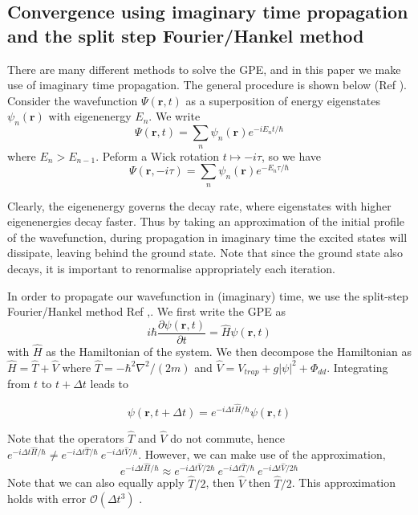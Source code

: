 \documentclass[10pt]{article}
\numberwithin{equation}{section}
\begin{document}
\begin{multicols}{2}
\section{Convergence using imaginary time propagation and the split step Fourier/Hankel method}
There are many different methods to solve the GPE, and in this paper we make use of imaginary time propagation. The general procedure is shown below (Ref \cite{PhysRevE.62.7438}).
Consider the wavefunction $\Psi(\textbf{r},t)$ as a superposition of energy eigenstates $\psi_{n}(\textbf{r})$ with eigenenergy $E_n$. We write
\begin{equation}
\Psi(\textbf{r},t) = \sum_n \psi_{n}(\textbf{r}) e^{-i E_n t /\hbar}
\end{equation}
where $E_n > E_{n-1}$. Peform a Wick rotation $t \mapsto -i \tau$, so we have
\begin{equation}
\Psi(\textbf{r},-i\tau) = \sum_n \psi_{n}(\textbf{r}) e^{-E_n \tau /\hbar}
\end{equation}

Clearly, the eigenenergy governs the decay rate, where eigenstates with higher eigenenergies decay faster. Thus by taking an approximation of the initial profile of the wavefunction, during propagation in imaginary time the excited states will dissipate, leaving behind the ground state. Note that since the ground state also decays, it is important to renormalise appropriately each iteration.

In order to propagate our wavefunction in (imaginary) time, we use the split-step Fourier/Hankel method Ref \cite{4451240},\cite{TAHA1984231}. We first write the GPE as
\begin{equation}
i\hbar \frac{\partial \psi(\textbf{r},t)}{\partial t}=\hat{H} \psi(\textbf{r},t)
\end{equation}
with $\hat{H}$ as the Hamiltonian of the system. We then decompose the Hamiltonian as $\hat{H} = \hat{T} + \hat{V}$ where $\hat{T} = -\hbar^2 \nabla^2 /(2m)$ and $\hat{V} = V_{trap} + g|\psi|^2 + \Phi_{dd}$. Integrating from $t$ to $t + \Delta t$ leads to

\begin{equation}
\psi(\textbf{r},t+\Delta t) = e^{-i \Delta t \hat{H} /\hbar}\psi(\textbf{r},t)
\end{equation}

Note that the operators $\hat{T}$ and $\hat{V}$ do not commute, hence $e^{-i \Delta t \hat{H} /\hbar} \neq e^{-i \Delta t \hat{T} /\hbar} \ e^{-i \Delta t \hat{V} /\hbar}$. However, we can make use of the approximation, 
\begin{equation}
e^{-i \Delta t \hat{H} /\hbar} \approx e^{-i \Delta t \hat{V} /2\hbar} \ e^{-i \Delta t \hat{T} /\hbar} \ e^{-i \Delta t \hat{V} /2\hbar}
\end{equation}
Note that we can also equally apply $\hat{T}/2$, then $\hat{V}$ then $\hat{T}/2$. This approximation holds with error $\mathcal{O}(\Delta t^3)$ \cite{LIU20091435}.


\end{multicols}
\end{document}

